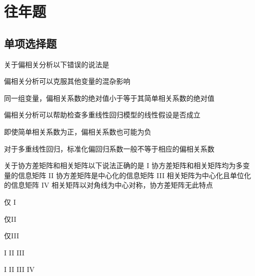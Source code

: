 
\label{chapter:1}

\section{往年题}

\subsection{单项选择题}

\par\addvspace{6pt}\noindent\begin{minipage}{\linewidth}


关于偏相关分析以下错误的说法是


\begin{choices}

\item 偏相关分析可以克服其他变量的混杂影响

\item 同一组变量，偏相关系数的绝对值小于等于其简单相关系数的绝对值

\item 偏相关分析可以帮助检查多重线性回归模型的线性假设是否成立

\item 即使简单相关系数为正，偏相关系数也可能为负

\item 对于多重线性回归，标准化偏回归系数一般不等于相应的偏相关系数

\end{choices}

\end{minipage}\par\vspace{4pt}

\par\addvspace{6pt}\noindent\begin{minipage}{\linewidth}


关于协方差矩阵和相关矩阵以下说法正确的是 I 协方差矩阵和相关矩阵均为多变量的信息矩阵 II 协方差矩阵是中心化的信息矩阵 III 相关矩阵为中心化且单位化的信息矩阵 IV 相关矩阵以对角线为中心对称，协方差矩阵无此特点


\begin{choices}

\item 仅 I

\item 仅II

\item 仅III

\item I II III

\item I II III IV

\end{choices}

\end{minipage}\par\vspace{4pt}

